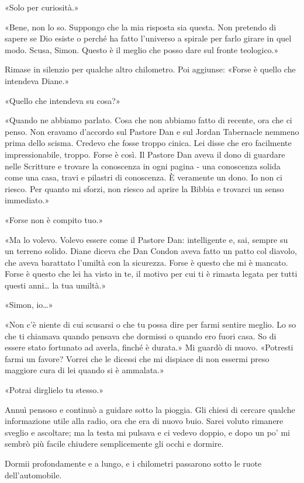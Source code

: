 «Solo per curiosità.»

«Bene, non lo so. Suppongo che la mia risposta sia questa. Non pretendo
di sapere se Dio esiste o perché ha fatto l'universo a spirale per farlo
girare in quel modo. Scusa, Simon. Questo è il meglio che posso dare sul
fronte teologico.»

Rimase in silenzio per qualche altro chilometro. Poi aggiunse: «Forse è
quello che intendeva Diane.»

«Quello che intendeva su cosa?»

«Quando ne abbiamo parlato. Cosa che non abbiamo fatto di recente, ora
che ci penso. Non eravamo d'accordo sul Pastore Dan e sul Jordan
Tabernacle nemmeno prima dello scisma. Credevo che fosse troppo cinica.
Lei disse che ero facilmente impressionabile, troppo. Forse è così. Il
Pastore Dan aveva il dono di guardare nelle Scritture e trovare la
conoscenza in ogni pagina - una conoscenza solida come una casa, travi e
pilastri di conoscenza. È veramente un dono. Io non ci riesco. Per
quanto mi sforzi, non riesco ad aprire la Bibbia e trovarci un senso
immediato.»

«Forse non è compito tuo.»

«Ma lo volevo. Volevo essere come il Pastore Dan: intelligente e, sai,
sempre su un terreno solido. Diane diceva che Dan Condon aveva fatto un
patto col diavolo, che aveva barattato l'umiltà con la sicurezza. Forse
è questo che mi è mancato. Forse è questo che lei ha visto in te, il
motivo per cui ti è rimasta legata per tutti questi anni\ldots{} la tua
umiltà.»

«Simon, io\ldots»

«Non c'è niente di cui scusarsi o che tu possa dire per farmi sentire
meglio. Lo so che ti chiamava quando pensava che dormissi o quando ero
fuori casa. So di essere stato fortunato ad averla, finché è durata.» Mi
guardò di nuovo. «Potresti farmi un favore? Vorrei che le dicessi che mi
dispiace di non essermi preso maggiore cura di lei quando si è
ammalata.»

«Potrai dirglielo tu stesso.»

Annuì pensoso e continuò a guidare sotto la pioggia. Gli chiesi di
cercare qualche informazione utile alla radio, ora che era di nuovo
buio. Sarei voluto rimanere sveglio e ascoltare; ma la testa mi pulsava
e ci vedevo doppio, e dopo un po' mi sembrò più facile chiudere
semplicemente gli occhi e dormire.

\separatorefiori

Dormii profondamente e a lungo, e i chilometri passarono sotto le ruote
dell'automobile.

